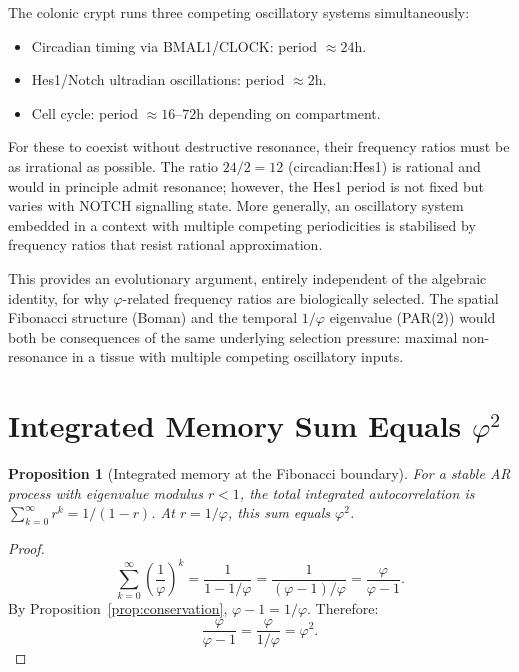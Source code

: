 \documentclass[11pt,letterpaper]{article}
\newtheorem{proposition}{Proposition}
\theoremstyle{definition}
\theoremstyle{remark}
\begin{document}
The colonic crypt runs three competing oscillatory systems simultaneously:
\begin{itemize}
\item Circadian timing via BMAL1/CLOCK: period $\approx 24$h.
\item Hes1/Notch ultradian oscillations: period $\approx 2$h.
\item Cell cycle: period $\approx 16$--$72$h depending on compartment.
\end{itemize}

For these to coexist without destructive resonance, their frequency ratios must be as irrational
as possible. The ratio $24/2 = 12$ (circadian:Hes1) is rational and would in principle admit
resonance; however, the Hes1 period is not fixed but varies with NOTCH signalling state. More
generally, an oscillatory system embedded in a context with multiple competing periodicities is
stabilised by frequency ratios that resist rational approximation.

This provides an evolutionary argument, entirely independent of the algebraic identity, for why
$\varphi$-related frequency ratios are biologically selected. The spatial Fibonacci structure
(Boman) and the temporal $1/\varphi$ eigenvalue (PAR(2)) would both be consequences of the same
underlying selection pressure: maximal non-resonance in a tissue with multiple competing
oscillatory inputs.

\section{Integrated Memory Sum Equals $\varphi^2$}
\label{sec:integrated_memory}

\begin{proposition}[Integrated memory at the Fibonacci boundary]\label{prop:integrated}
For a stable AR process with eigenvalue modulus $r < 1$, the total integrated autocorrelation
is $\sum_{k=0}^{\infty} r^k = 1/(1-r)$. At $r = 1/\varphi$, this sum equals $\varphi^2$.
\end{proposition}

\begin{proof}
\[
\sum_{k=0}^{\infty} \left(\frac{1}{\varphi}\right)^k
= \frac{1}{1 - 1/\varphi}
= \frac{1}{(\varphi-1)/\varphi}
= \frac{\varphi}{\varphi - 1}.
\]
By Proposition~\ref{prop:conservation}, $\varphi - 1 = 1/\varphi$. Therefore:
\[
\frac{\varphi}{\varphi - 1} = \frac{\varphi}{1/\varphi} = \varphi^2.
\]
\end{proof}
\end{document}
